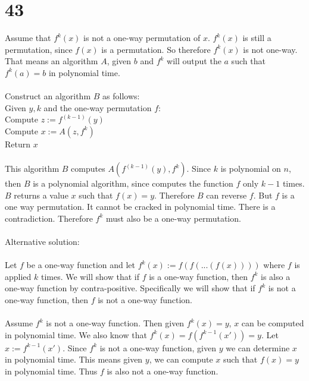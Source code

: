 \documentclass[letterpaper,notitlepage,twoside]{article}
\newcommand\tab[1][1cm]{\hspace*{#1}} %
\begin{document}
\section*{43}
Assume that $f^k(x)$ is not a one-way permutation of $x$. $f^k(x)$ is still a permutation, since $f(x)$ is a permutation. So therefore $f^k(x)$ is not one-way. That means an algorithm $A$, given $b$ and $f^k$ will output the $a$ such that $f^k(a) = b$ in polynomial time. \\\\
Construct an algorithm $B$ as follows: \\
Given $y, k$ and the one-way permutation $f$: \\
\tab Compute $z := f^{(k - 1)}(y)$ \\
\tab Compute $x := A(z, f^k)$ \\
\tab Return $x$\\\\
This algorithm $B$ computes $A(f^{(k - 1)}(y), f^k)$. Since $k$ is polynomial on $n$, then $B$ is a polynomial algorithm, since computes the function $f$ only $k - 1$ times. $B$ returns a value $x$ such that $f(x) = y$. Therefore $B$ can reverse $f$. But $f$ is a one way permutation. It cannot be cracked in polynomial time. There is a contradiction. Therefore $f^k$ must also be a one-way permutation.
\\\\
Alternative solution:
\\\\
Let $f$ be a one-way function and let $f^k(x) := f(f(...(f(x))))$ where $f$ is applied $k$ times. We will show that if $f$ is a one-way function, then $f^k$ is also a one-way function by contra-positive. Specifically we will show that if $f^k$ is not a one-way function, then $f$ is not a one-way function.
\\\\
Assume $f^k$ is not a one-way function. Then given $f^k(x) = y$, $x$ can be computed in polynomial time. We also know that $ f^k(x) = f(f^{k-1}(x')) = y$. Let $x := f^{k-1}(x')$. Since $f^k$ is not a one-way function, given $y$ we can determine $x$ in polynomial time. This means given $y$, we can compute $x$ such that $f(x) = y$ in polynomial time. Thus $f$ is also not a one-way function.
\end{document}
